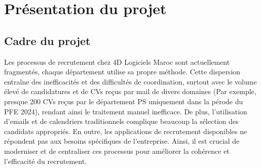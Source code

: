 



\section{Présentation du projet}

\subsection{Cadre du projet }

Les processus de recrutement chez 4D Logiciels Maroc sont 
actuellement fragmentés, chaque département utilise sa propre 
méthode. Cette dispersion entraîne des inefficacités et des 
difficultés de coordination, surtout avec le volume élevé de 
candidatures et de CVs reçus par mail de divers domaines 
(Par exemple, presque 200 CVs reçus par le département PS uniquement 
dans la pérode du PFE 2024), rendant  ainsi le traitement 
manuel inefficace. De plus, l'utilisation d'emails et de 
calendriers traditionnels complique beaucoup la sélection des candidats 
appropriés. En outre, les applications de recrutement disponibles 
ne répondent pas aux besoins spécifiques de l'entreprise. Ainsi, 
il est crucial de moderniser et de centraliser ces processus 
pour améliorer la cohérence et l'efficacité du recrutement.

